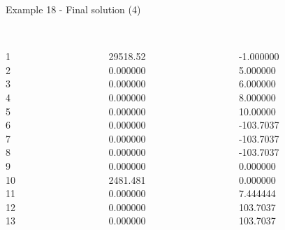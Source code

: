 \begin{frame}{Example 18 - Final solution (4)}
\begin{columns}[t]
\begin{column}{0.3\textwidth}
\\
1\\
2\\
3\\
4\\
5\\
6\\
7\\
8\\
9\\
10\\
11\\
12\\
13\\
\end{column}
\begin{column}{0.3\textwidth}
\\
29518.52\\
0.000000\\
0.000000\\
0.000000\\
0.000000\\
0.000000\\
0.000000\\
0.000000\\
0.000000\\
2481.481\\
0.000000\\
0.000000\\
0.000000\\

\end{column}

\begin{column}{0.3\textwidth}
\\
-1.000000\\
5.000000\\
6.000000\\
8.000000\\
10.00000\\
-103.7037\\
-103.7037\\
-103.7037\\
0.000000\\
0.000000\\
7.444444\\
103.7037\\
103.7037\\
\end{column}
\end{columns}
\end{frame}

